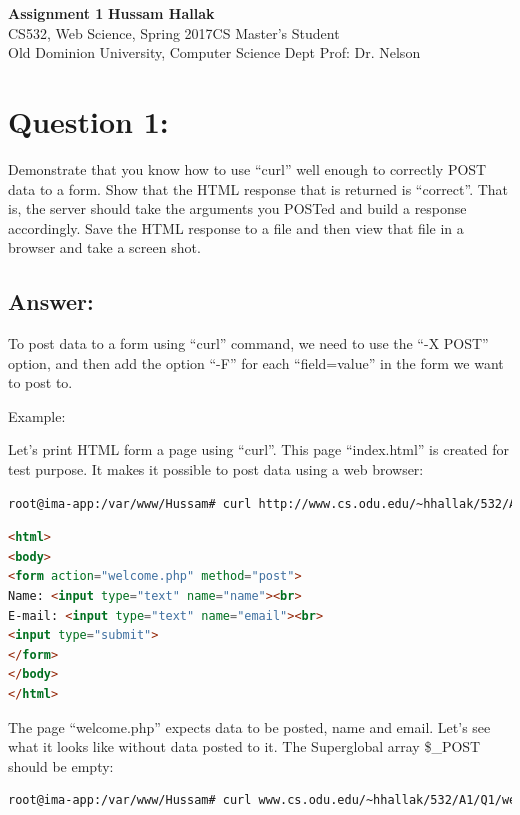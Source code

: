\documentclass[a4paper, 11pt]{article}
\begin{document}
\noindent
\large\textbf{Assignment 1} \hfill \textbf{Hussam Hallak} \\
\normalsize CS532, Web Science, Spring 2017\hfill CS Master's Student \\
Old Dominion University, Computer Science Dept \hfill Prof: Dr. Nelson 

\section*{Question 1:}
Demonstrate that you know how to use ``curl'' well enough to correctly POST data to a form. Show that the HTML response that is returned is ``correct''. That is, the server should take the arguments you POSTed and build a response accordingly. Save the HTML response to a file and then view that file in a browser and take a screen shot.

\subsection*{Answer:}
To post data to a form using ``curl'' command, we need to use the ``-X POST'' option, and then add the option ``-F'' for each ``field=value'' in the form we want to post to.

Example: 

Let's print HTML form a page using ``curl''. This page ``index.html'' is created for test purpose. It makes it possible to post data using a web browser:

\begin{lstlisting}[language=bash,label=Command:,caption=Command:]
root@ima-app:/var/www/Hussam# curl http://www.cs.odu.edu/~hhallak/532/A1/Q1/index.html
\end{lstlisting}
\begin{lstlisting}[language=html,label=Output:,caption=Output: The content of index.html]
<html>
<body>
<form action="welcome.php" method="post">
Name: <input type="text" name="name"><br>
E-mail: <input type="text" name="email"><br>
<input type="submit">
</form>
</body>
</html>
\end{lstlisting}
The page ``welcome.php'' expects data to be posted, name and email. Let's see what it looks like without data posted to it. The Superglobal array \$\_POST should be empty:

\begin{lstlisting}[language=bash,label=Command:,caption=Command:]
root@ima-app:/var/www/Hussam# curl www.cs.odu.edu/~hhallak/532/A1/Q1/welcome.php  
\end{lstlisting}
\end{document}
